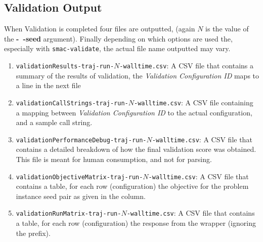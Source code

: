 \documentclass[manual.tex]{subfiles}
\begin{document}
\subsection{Validation Output}

When Validation is completed four files are outputted, (again $N$ is the value of the \textbf{-~$\!\!$-seed} argument). Finally depending on which options are used the, especially with \texttt{smac-validate}, the actual file name outputted may vary.

\begin{enumerate}
\item \texttt{validationResults-traj-run-$N$-walltime.csv}:
A CSV file that contains a summary of the results of validation, the \textit{Validation Configuration ID} maps to a line in the next file

\item \texttt{validationCallStrings-traj-run-$N$-walltime.csv}:
A CSV file containing a mapping between \textit{Validation Configuration ID} to
the actual configuration, and a sample call string.

\item \texttt{validationPerformanceDebug-traj-run-$N$-walltime.csv}:
A CSV file that contains a detailed breakdown of how the final validation score
was obtained. This file is meant for human consumption, and not for parsing.

\item \texttt{validationObjectiveMatrix-traj-run-$N$-walltime.csv}:
A CSV file that contains a table, for each row (configuration) the objective for the problem instance seed pair as given in the column.

\item \texttt{validationRunMatrix-traj-run-$N$-walltime.csv}:
A CSV file that contains a table, for each row (configuration) the response from the wrapper (ignoring the prefix).

\end{enumerate}
\end{document}
